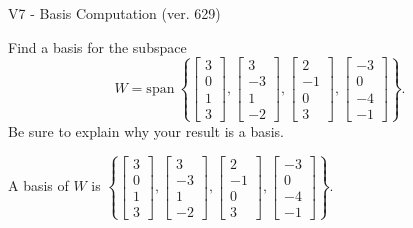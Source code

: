 \begin{exercise}
  \begin{exerciseTitle}V7 - Basis Computation (ver. 629)\end{exerciseTitle}
  \begin{exerciseStatement}
    Find a basis for the subspace 
\[W=\mathrm{span}\ \left\{\left[\begin{array}{r}
3 \\
0 \\
1 \\
3
\end{array}\right] , \left[\begin{array}{r}
3 \\
-3 \\
1 \\
-2
\end{array}\right] , \left[\begin{array}{r}
2 \\
-1 \\
0 \\
3
\end{array}\right] , \left[\begin{array}{r}
-3 \\
0 \\
-4 \\
-1
\end{array}\right]\right\}.\]
 Be sure to explain why your result is a basis.


  \end{exerciseStatement}
  \begin{exerciseAnswer}
   A basis of \(W\) is  \(\left\{\left[\begin{array}{r}
3 \\
0 \\
1 \\
3
\end{array}\right] , \left[\begin{array}{r}
3 \\
-3 \\
1 \\
-2
\end{array}\right] , \left[\begin{array}{r}
2 \\
-1 \\
0 \\
3
\end{array}\right] , \left[\begin{array}{r}
-3 \\
0 \\
-4 \\
-1
\end{array}\right]\right\}\).
  


  \end{exerciseAnswer}
\end{exercise}